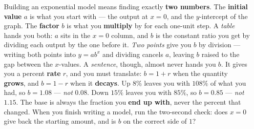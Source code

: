 \documentclass[10pt]{article}
\begin{document}
\vspace{0.10in}

\begin{remindbox}
\small Building an exponential model means finding exactly \textbf{two numbers}. The \textbf{initial
value} $a$ is what you start with --- the output at $x=0$, and the $y$-intercept of the graph. The
\textbf{factor} $b$ is what you \textbf{multiply} by for each one-unit step. A \emph{table} hands you
both: $a$ sits in the $x=0$ column, and $b$ is the constant ratio you get by dividing each output by
the one before it. \emph{Two points} give you $b$ by division --- writing both points into $y=ab^{x}$
and dividing cancels $a$, leaving $b$ raised to the gap between the $x$-values. A \emph{sentence},
though, almost never hands you $b$. It gives you a percent \textbf{rate} $r$, and you must translate:
$b=1+r$ when the quantity \textbf{grows}, and $b=1-r$ when it \textbf{decays}. Up $8\%$ leaves you
with $108\%$ of what you had, so $b=1.08$ --- \emph{not} $0.08$. Down $15\%$ leaves you with $85\%$,
so $b=0.85$ --- \emph{not} $1.15$. The base is always the fraction you \textbf{end up with}, never
the percent that changed. When you finish writing a model, run the two-second check: does $x=0$ give
back the starting amount, and is $b$ on the correct side of $1$?
\end{remindbox}
\end{document}
